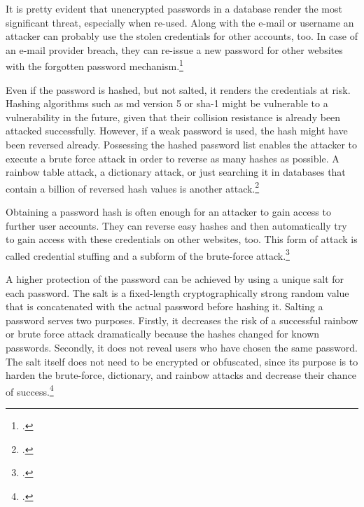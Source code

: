 It is pretty evident that unencrypted passwords in a database render the most significant threat, especially when re-used. Along with the e-mail or username an attacker can probably use the stolen credentials for other accounts, too. In case of an e-mail provider breach, they can re-issue a new password for other websites with the \frqq forgotten password\flqq{} mechanism.\footcite[See][277]{shostack2014threat}

Even if the password is hashed, but not salted, it renders the credentials at risk. Hashing algorithms such as \gls{md} version 5 or \gls{sha}-1 might be vulnerable to a vulnerability in the future, given that their collision resistance is already been attacked successfully. However, if a weak password is used, the hash might have been reversed already. Possessing the hashed password list enables the attacker to execute a brute force attack in order to reverse as many hashes as possible. A rainbow table attack, a dictionary attack, or just searching it in databases that contain a billion of reversed hash values is another attack.\footcites[See][1425]{Thomas:2017:DBP:3133956.3134067}[See][427--430]{doi:10.1002/9781118256107.ch37}[See][56--57]{anderson2008security}

Obtaining a password hash is often enough for an attacker to gain access to further user accounts. They can reverse easy hashes and then automatically try to gain access with these credentials on other websites, too. This form of attack is called \frqq credential stuffing\flqq{} and a subform of the brute-force attack.\footcites[See][]{troy-hunt-1}[See][1565]{48399}[See][Chapter 5.5]{zabicki2019practical}

A higher protection of the password can be achieved by using a unique \frqq salt\flqq{} for each password. The salt is a fixed-length cryptographically strong random value that is concatenated with the actual password before hashing it. Salting a password serves two purposes. Firstly, it decreases the risk of a successful rainbow or brute force attack dramatically because the hashes changed for known passwords. Secondly, it does not reveal users who have chosen the same password. The salt itself does not need to be encrypted or obfuscated, since its purpose is to harden the brute-force, dictionary, and rainbow attacks and decrease their chance of success.\footcites[See][32--34]{IdentityandDataSecurityforWebDevelopment}[See][130--131]{brotherston2017defensive}[See][15]{SP80063B}

